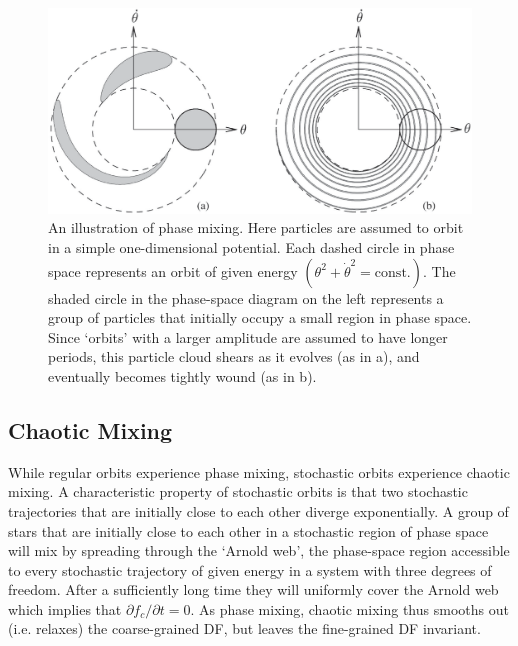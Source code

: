 \documentclass[12pt,a4paper]{article}
\begin{document}
\begin{figure}
\centering
\includegraphics[height=7.cm, angle=0]{phase_mixing.eps}
\caption{
An illustration of phase mixing. Here particles are assumed to orbit in a simple one-dimensional potential. Each dashed circle in phase space represents an orbit of given energy $(\theta^2 + \dot{\theta}^2 = \text{const}.)$. The shaded circle in the phase-space diagram on the left represents a group of particles that initially occupy a small region in phase space. Since ‘orbits’ with a larger amplitude are assumed to have longer periods, this particle cloud shears as it evolves (as in a), and eventually becomes tightly wound (as in b).
}
\label{fig:homopolar}
\end{figure}

\subsection{Chaotic Mixing}
\cite{2010gfe..book.....M} While regular orbits experience phase mixing, stochastic orbits experience chaotic mixing. A characteristic property of stochastic orbits is that two stochastic trajectories that are initially close to each other diverge exponentially. A group of stars that are initially close to each other in a stochastic region of phase space will mix by spreading through the `Arnold web', the phase-space region accessible to every stochastic trajectory of given energy in a system with three degrees of freedom. After a sufficiently long time they will uniformly cover the Arnold web which implies that $\partial f_c/\partial t = 0$. As phase mixing, chaotic mixing thus smooths out (i.e. relaxes) the coarse-grained DF, but leaves the fine-grained DF invariant.
\end{document}
